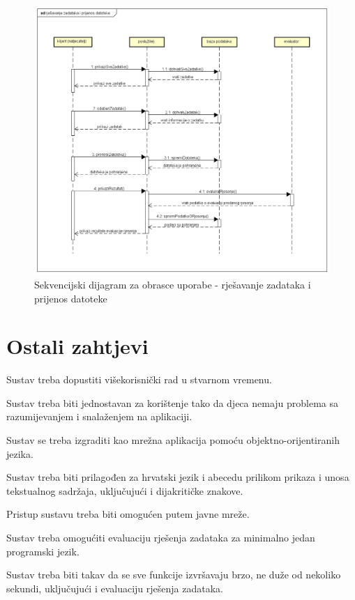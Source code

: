 				\begin{figure}[H]
					\includegraphics[scale=0.5]{dijagrami/sd10_sd13.png} 
					\centering
					\caption{Sekvencijski dijagram za obrasce uporabe -  rješavanje zadataka i prijenos datoteke}
					\label{fig:sekvencijski3}
				\end{figure}
				

				\eject	
		\section{Ostali zahtjevi}
			 
			 \begin{packed_item}
			 	
			 	\item Sustav treba dopustiti višekorisnički rad u stvarnom vremenu.
			 	\item Sustav treba biti jednostavan za korištenje tako da djeca nemaju problema sa razumijevanjem i snalaženjem na aplikaciji.
			 	\item Sustav se treba izgraditi kao mrežna aplikacija pomoću objektno-orijentiranih jezika.
			 	\item Sustav treba biti prilagođen za hrvatski jezik i abecedu prilikom prikaza i unosa tekstualnog sadržaja, uključujući i dijakritičke znakove.
			 	\item Pristup sustavu treba biti omogućen putem javne mreže.
			 	\item Sustav treba omogućiti evaluaciju rješenja zadataka za minimalno jedan programski jezik.
			 	\item Sustav treba biti takav da se sve funkcije izvršavaju brzo, ne duže od nekoliko sekundi, uključujući i evaluaciju rješenja zadataka.
			 	
			 \end{packed_item}
			 
	